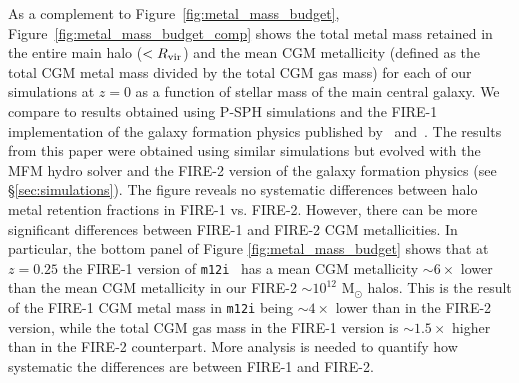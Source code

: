 \documentclass[fleqn,usenatbib]{mnras}
\begin{document}
As a complement to Figure~\ref{fig:metal_mass_budget}, Figure~\ref{fig:metal_mass_budget_comp} shows the total metal mass retained in the entire main halo ($<R_{\rm vir}$) and the mean CGM metallicity (defined as the total CGM metal mass divided by the total CGM gas mass) for each of our simulations at $z=0$ as a function of stellar mass of the main central galaxy. 
We compare to results obtained using P-SPH simulations and the FIRE-1 implementation of the galaxy formation physics published by~\cite{Ma2015} and~\cite{Muratov2016}.
The results from this paper were obtained using similar simulations but evolved with the MFM hydro solver and the FIRE-2 version of the galaxy formation physics (see \S\ref{sec:simulations}). 
The figure reveals no systematic differences between halo metal retention fractions in FIRE-1 vs. FIRE-2. 
However, there can be more significant differences between FIRE-1 and FIRE-2 CGM metallicities. 
In particular, the bottom panel of Figure \ref{fig:metal_mass_budget} shows that at $z=0.25$ the FIRE-1 version of \texttt{m12i}~\citep{Hopkins2014} has a mean CGM metallicity $\sim 6\times$ lower than the mean CGM metallicity in our FIRE-2 $\sim 10^{12}$ M$_\odot$ halos. 
This is the result of the FIRE-1 CGM metal mass in \texttt{m12i} being $\sim 4 \times$ lower than in the FIRE-2 version, while the total CGM gas mass in the FIRE-1 version is $\sim 1.5 \times$ higher than in the FIRE-2 counterpart. 
More analysis is needed to quantify how systematic the differences are between FIRE-1 and FIRE-2.



\bsp	%
\label{lastpage}
\end{document}
